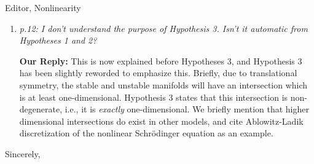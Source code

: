 \documentclass[11pt]{letter}
\begin{document}
\begin{letter}{Editor, Nonlinearity}
\begin{enumerate}
 {\bf Our Reply:}     Lin's method constructs multi-breathers as a sequence of well-separated copies of the primary breather, to leading order. There will be a remainder term, but this will be small. This has been clarified in the revised manuscript. We have added a paragraph on page 3, as well as schematics in Figure 1, as a high-level explanation of Lin's method. This is also clarified in the first paragraph of Section 4.2. We also added a few sentences on page 4 regarding the application Lin's method to the construction of eigenfunctions.
    \vspace{4mm}

    \item \emph{p.12: I don’t understand the purpose of Hypothesis 3. Isn’t it automatic from Hypotheses 1 and 2?}
 
  {\bf Our Reply:}    This is now explained before Hypotheses 3, and Hypothesis 3 has been slightly reworded to emphasize this. Briefly, due to translational symmetry, the stable and unstable manifolds will have an intersection which is at least one-dimensional. Hypothesis 3 states that this intersection is non-degenerate, i.e., it is \emph{exactly} one-dimensional. We briefly mention that higher dimensional intersections do exist in other models, and cite Ablowitz-Ladik discretization of the nonlinear Schr{\"o}dinger equation as an example.
\end{enumerate}


\closing{Sincerely,}

\end{letter}
\end{document}
